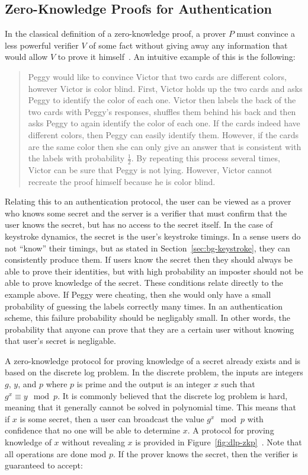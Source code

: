 \documentclass[11pt]{article}
\begin{document}
\subsection{Zero-Knowledge Proofs for Authentication}
\label{sec:bg-zkp}
In the classical definition of a zero-knowledge proof, a prover $P$ must convince a less powerful verifier $V$ of some fact without giving away any information that would allow $V$ to prove it himself~\cite{GMW86}. An intuitive example of this is the following:

\begin{quote}\small
Peggy would like to convince Victor that two cards are different colors, however Victor is color blind. First, Victor holds up the two cards and asks Peggy to identify the color of each one. Victor then labels the back of the two cards with Peggy's responses, shuffles them behind his back and then asks Peggy to again identify the color of each one. If the cards indeed have different colors, then Peggy can easily identify them. However, if the cards are the same color then she can only give an answer that is consistent with the labels with probability $\frac12$. By repeating this process several times, Victor can be sure that Peggy is not lying. However, Victor cannot recreate the proof himself because he is color blind.
\end{quote}

\noindent Relating this to an authentication protocol, the user can be viewed as a prover who knows some secret and the server is a verifier that must confirm that the user knows the secret, but has no access to the secret itself. In the case of keystroke dynamics, the secret is the user's keystroke timings. In a sense users do not ``know'' their timings, but as stated in Section~\ref{sec:bg-keystroke}, they can consistently produce them. If users know the secret then they should always be able to prove their identities, but with high probability an imposter should not be able to prove knowledge of the secret. These conditions relate directly to the example above. If Peggy were cheating, then she would only have a small probability of guessing the labels correctly many times. In an authentication scheme, this failure probability should be negligably small. In other words, the probability that anyone can prove that they are a certain user without knowing that user's secret is negligable.

A zero-knowledge protocol for proving knowledge of a secret already exists and is based on the discrete log problem. In the discrete problem, the inputs are integers $g$, $y$, and $p$ where $p$ is prime and the output is an integer $x$ such that $g^x\equiv y\mod p$. It is commonly believed that the discrete log problem is hard, meaning that it generally cannot be solved in polynomial time. This means that if $x$ is some secret, then a user can broadcast the value $g^x\mod p$ with confidence that no one will be able to determine $x$. A protocol for proving knowledge of $x$ without revealing $x$ is provided in Figure~\ref{fig:dlp-zkp}~\cite{crypto-1986-1125}. Note that all operations are done mod $p$. If the prover knows the secret, then the verifier is guaranteed to accept:
\end{document}
